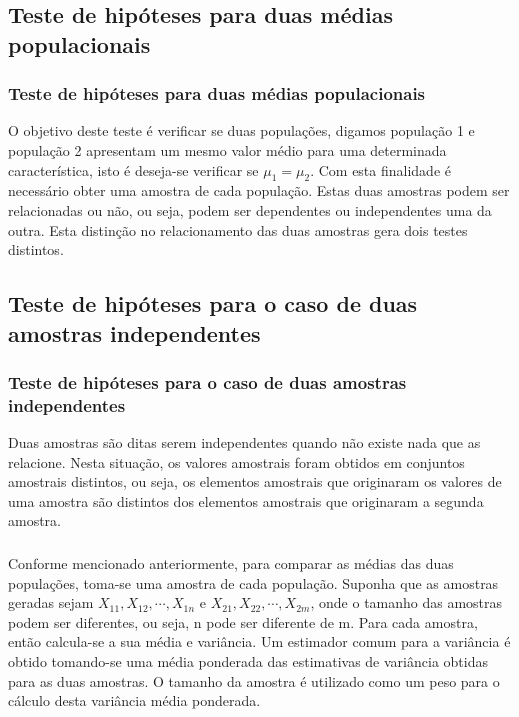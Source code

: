 \documentclass[14pt,aspectratio=1610]{beamer}
\begin{document}
\subsection{Teste de hipóteses para duas médias populacionais}
\begin{frame}{}
\frametitle{Teste de hipóteses para duas médias populacionais}
\begin{block}{}
\justifying
O objetivo deste teste é verificar se duas populações, digamos população 1 e população 2 apresentam um mesmo valor 
médio para uma determinada característica, isto é deseja-se verificar se $\mu_{1}=\mu_{2}$. Com esta finalidade é 
necessário obter uma amostra de cada população. Estas duas amostras podem ser relacionadas ou não, ou 
seja, podem ser dependentes ou independentes uma da outra. Esta distinção no relacionamento das duas amostras gera 
dois testes distintos.
\end{block}
\end{frame}

\subsection{Teste de hipóteses para o caso de duas amostras independentes}
\begin{frame}{}
\frametitle{Teste de hipóteses para o caso de duas amostras independentes}
\begin{block}{}
\justifying
Duas amostras são ditas serem independentes quando não existe nada que as relacione. Nesta situação, os valores 
amostrais foram obtidos em conjuntos amostrais distintos, ou seja, os elementos amostrais que originaram os valores de 
uma amostra são distintos dos elementos amostrais que originaram a segunda amostra.
\end{block}
\end{frame}

\begin{frame}{}
\frametitle{}
\begin{block}{}
\justifying
Conforme mencionado anteriormente, para comparar as médias das duas populações, toma-se uma amostra de cada 
população. Suponha que as amostras geradas sejam $X_{11},X_{12},\cdots,X_{1n}$ e $X_{21},X_{22},\cdots,X_{2m}$, 
onde o tamanho das amostras podem ser diferentes, ou seja, n pode ser diferente de m. Para cada amostra, então 
calcula-se a sua média e variância. Um estimador comum para a variância é obtido tomando-se uma média ponderada das 
estimativas de variância obtidas para as duas amostras. O tamanho da amostra é utilizado como um peso para o cálculo 
desta variância média ponderada.
\end{block}
\end{frame}
\end{document}
